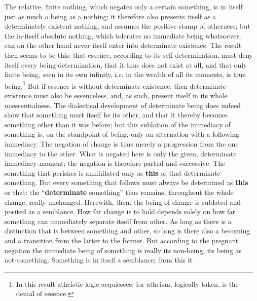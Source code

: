 \documentclass[12pt,a4paper,openany]{book}
\newcommand{\opage}[1]{\marginnote{\footnotesize\textit{[#1]}}}
\begin{document}
The relative, finite nothing, which negates only a certain something, is in itself just as much a being as a nothing; it therefore also presents itself as a determinately existent nothing, and assumes the positive stamp of otherness; but the in-itself absolute nothing, which tolerates no immediate being whatsoever, can on the other hand never itself enter into determinate existence.
\setcounter{footnote}{0}%
\opage{97}The result then seems to be this: that essence, according to its self-determination, must deny itself every being-determination, that it thus does not exist at all, and that only finite being, seen in its own infinity, i.e. in the wealth of all its moments, is true being.\footnote{In this result atheistic logic acquiesces; for atheism, logically taken, is the denial of essence.}
 But if essence is without determinate existence, then determinate existence must also be essenceless, and, as such, present itself in its whole unessentialness. The dialectical development of determinate being does indeed show that something must itself be its other, and that it thereby becomes something other than it was before; but this sublation of the immediacy of something is, on the standpoint of being, only an alternation with a following immediacy. The negation of change is thus merely a progression from the one immediacy to the other. What is negated here is only the given, determinate immediacy-moment; the negation is therefore partial and successive. The something that perishes is annihilated only as \textbf{this} or that determinate something. But every something that follows must always be determined as \textbf{this} or that: the ``\textbf{determinate} something'' thus remains, throughout the whole change, really unchanged. Herewith, then, the being of change is sublated and posited as a semblance. How far change is to hold depends solely on how far something can immediately separate itself from other. As long as there is a distinction that is between something and other, so long is there also a becoming and a transition from the latter to the former. But according to the pregnant negation the immediate being of something is really its non-being, its being as not-something. Something is in itself a semblance; from this it
\setcounter{footnote}{0}%
\end{document}

